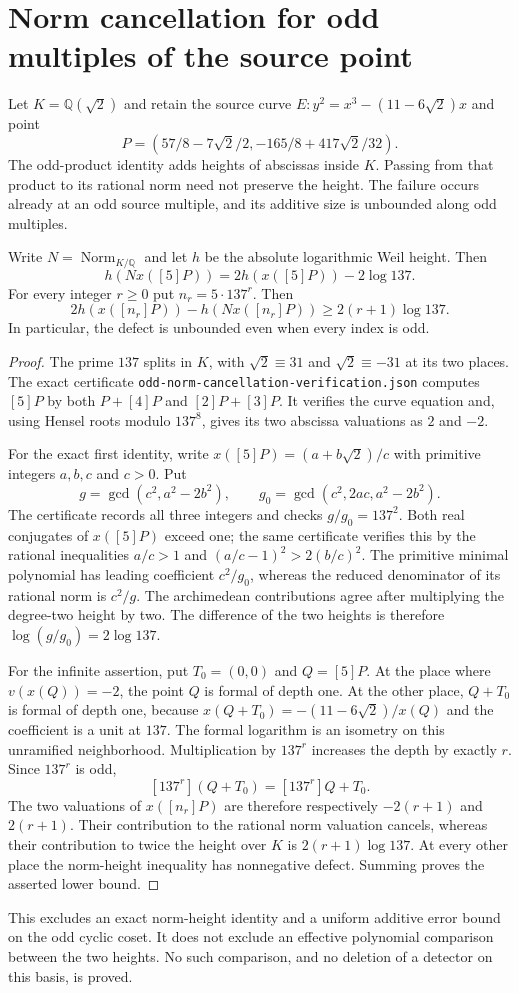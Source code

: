\section{Norm cancellation for odd multiples of the source point}
\label{sec:odd-norm-cancellation}

Let $K=\mathbb Q(\sqrt2)$ and retain the source curve
$E:y^2=x^3-(11-6\sqrt2)x$ and point
\[
 P=\left(57/8-7\sqrt2/2,-165/8+417\sqrt2/32\right).
\]
The odd-product identity adds heights of abscissas inside $K$.
Passing from that product to its rational norm need not preserve
the height. The failure occurs already at an odd source multiple,
and its additive size is unbounded along odd multiples.

\begin{proposition}\label{cc:odd-norm-cancellation}
Write $N=\operatorname{Norm}_{K/\mathbb Q}$ and let $h$ be the
absolute logarithmic Weil height. Then
\[
        h(Nx([5]P))=2h(x([5]P))-2\log137.
\]
For every integer $r\ge0$ put $n_r=5\cdot137^r$. Then
\[
         2h(x([n_r]P))-h(Nx([n_r]P))
                         \ge2(r+1)\log137.
\]
In particular, the defect is unbounded even when every index is odd.
\end{proposition}
\begin{proof}
The prime $137$ splits in $K$, with $\sqrt2\equiv31$ and
$\sqrt2\equiv-31$ at its two places. The exact certificate
\texttt{odd-norm-cancellation-verification.json} computes $[5]P$
by both $P+[4]P$ and $[2]P+[3]P$. It verifies the curve equation
and, using Hensel roots modulo $137^8$, gives its two abscissa
valuations as $2$ and $-2$.

For the exact first identity, write $x([5]P)=(a+b\sqrt2)/c$ with
primitive integers $a,b,c$ and $c>0$. Put
\[
 g=\gcd(c^2,a^2-2b^2),\qquad
 g_0=\gcd(c^2,2ac,a^2-2b^2).
\]
The certificate records all three integers and checks $g/g_0=137^2$.
Both real conjugates of $x([5]P)$ exceed one; the same certificate
verifies this by the rational inequalities
$a/c>1$ and $(a/c-1)^2>2(b/c)^2$.
The primitive minimal polynomial has leading coefficient $c^2/g_0$,
whereas the reduced denominator of its rational norm is $c^2/g$.
The archimedean contributions agree after multiplying the degree-two
height by two. The difference of the two heights is therefore
$\log(g/g_0)=2\log137$.

For the infinite assertion, put $T_0=(0,0)$ and $Q=[5]P$.
At the place where $v(x(Q))=-2$, the point $Q$ is formal of
depth one. At the other place, $Q+T_0$ is formal of depth one,
because $x(Q+T_0)=-(11-6\sqrt2)/x(Q)$ and the coefficient is a
unit at $137$. The formal logarithm is an isometry on this
unramified neighborhood. Multiplication by $137^r$ increases
the depth by exactly $r$. Since $137^r$ is odd,
\[
          [137^r](Q+T_0)=[137^r]Q+T_0.
\]
The two valuations of $x([n_r]P)$ are therefore respectively
$-2(r+1)$ and $2(r+1)$. Their contribution to the rational norm
valuation cancels, whereas their contribution to twice the
height over $K$ is $2(r+1)\log137$. At every other place the
norm-height inequality has nonnegative defect. Summing proves
the asserted lower bound.
\end{proof}

This excludes an exact norm-height identity and a uniform additive
error bound on the odd cyclic coset. It does not exclude an
effective polynomial comparison between the two heights. No such
comparison, and no deletion of a detector on this basis, is proved.
